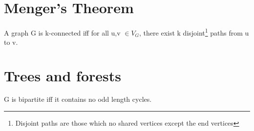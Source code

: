 \documentclass{article}
\begin{document}

\section{Menger's Theorem}
\begin{theorem}
    A graph G is k-connected iff for all u,v $\in V_{G}$, there exist k disjoint\footnote{\label{disjoint}Disjoint paths are those which no shared vertices except the end vertices} paths from u to v.
\end{theorem}

\section{Trees and forests}
\begin{theorem}
    G is bipartite iff it contains no odd length cycles.
\end{theorem}
\end{document}
